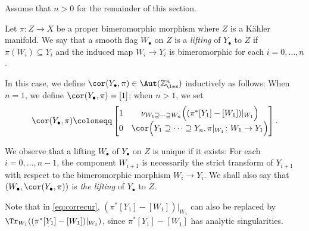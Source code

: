 Assume that $n>0$ for the remainder of this section.
\begin{definition}\label{def:lifting}
    Let $\pi\colon Z\rightarrow X$ be a proper bimeromorphic morphism where $Z$ is a Kähler manifold. We say that a smooth flag $W_{\bullet}$ on $Z$ is a \emph{lifting} of $Y_{\bullet}$ to $Z$ if $\pi(W_i)\subseteq Y_i$ and the induced map $W_i\to Y_i$ is bimeromorphic for each $i=0,\ldots,n$.

    In this case, we define $\cor(Y_{\bullet},\pi)\in \Aut(\mathbb{Z}^n_{\lex})$ inductively as follows: When $n=1$, we define $\cor(Y_{\bullet},\pi)=[1]$; when $n>1$, we set
    \begin{equation}\label{eq:correcur}
    \cor(Y_{\bullet},\pi)\coloneqq
    \begin{bmatrix}
    1 & \nu_{W_1\supseteq \cdots \supseteq W_n}\Bigl((\pi^*[Y_1]-[W_1])|_{W_1}\Bigr)\\
    0 & \cor\Bigl(Y_1\supseteq \cdots \supseteq Y_n,\pi|_{W_1}\colon W_1\rightarrow Y_1\Bigr)
    \end{bmatrix}.
    \end{equation}
\end{definition}
We observe that a lifting $W_{\bullet}$ of $Y_{\bullet}$ on $Z$ is unique if it exists: For each $i=0,\ldots,n-1$, the component $W_{i+1}$ is necessarily the strict transform of $Y_{i+1}$ with respect to the bimeromorphic morphism $W_i\rightarrow Y_i$. We shall also say that
$(W_{\bullet},\cor(Y_{\bullet},\pi))$ is \emph{the lifting} of $Y_{\bullet}$ to $Z$.

Note that in \eqref{eq:correcur}, $(\pi^*[Y_1]-[W_1])|_{W_1}$ can also be replaced by $\Tr_{W_1}((\pi^*[Y_1]-[W_1])|_{W_1})$, since $\pi^*[Y_1]-[W_1]$ has analytic singularities.



